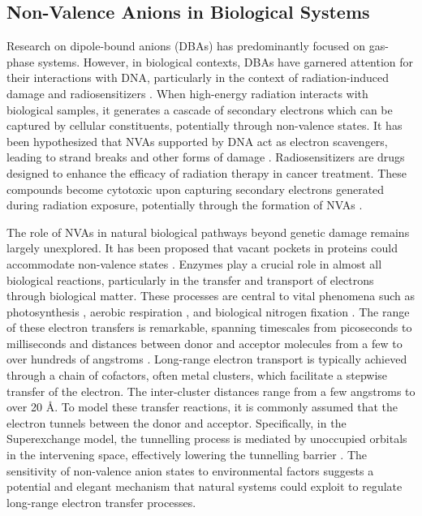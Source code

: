 \subsection{Non-Valence Anions in Biological Systems}

Research on dipole-bound anions (DBAs) has predominantly focused on gas-phase systems. However, in biological contexts, DBAs have garnered attention for their interactions with DNA, particularly in the context of radiation-induced damage and radiosensitizers \cite{gu2012interactions,narayanan2023secondary,sedmidubska2024interaction}.
When high-energy radiation interacts with biological samples, it generates a cascade of secondary electrons which can be captured by cellular constituents, potentially through non-valence states. It has been hypothesized that NVAs supported by DNA act as electron scavengers, leading to strand breaks and other forms of damage \cite{gu2012interactions,narayanan2023secondary,dutta2015electron,narayanan2024electron,sommerfeld2005dipole}.
Radiosensitizers are drugs designed to enhance the efficacy of radiation therapy in cancer treatment. These compounds become cytotoxic upon capturing secondary electrons generated during radiation exposure, potentially through the formation of NVAs \cite{sedmidubska2024interaction}.

The role of NVAs in natural biological pathways beyond genetic damage remains largely unexplored. It has been proposed that vacant pockets in proteins could accommodate non-valence states \cite{castellani2019stability}. Enzymes play a crucial role in almost all biological reactions, particularly in the transfer and transport of electrons through biological matter. These processes are central to vital phenomena such as photosynthesis \cite{mitchell1961coupling}, aerobic respiration \cite{wikstrom1977proton}, and biological nitrogen fixation \cite{rutledge2020electron}. The range of these electron transfers is remarkable, spanning timescales from picoseconds to milliseconds and distances between donor and acceptor molecules from a few to over hundreds of angstroms \cite{gray1996electron,blumberger2015recent}. Long-range electron transport is typically achieved through a chain of cofactors, often metal clusters, which facilitate a stepwise transfer of the electron. The inter-cluster distances range from a few angstroms to over 20 \r{A}. To model these transfer reactions, it is commonly assumed that the electron tunnels between the donor and acceptor. Specifically, in the Superexchange model, the tunnelling process is mediated by unoccupied orbitals in the intervening space, effectively lowering the tunnelling barrier \cite{blumberger2015recent}. The sensitivity of non-valence anion states to environmental factors suggests a potential and elegant mechanism that natural systems could exploit to regulate long-range electron transfer processes.


